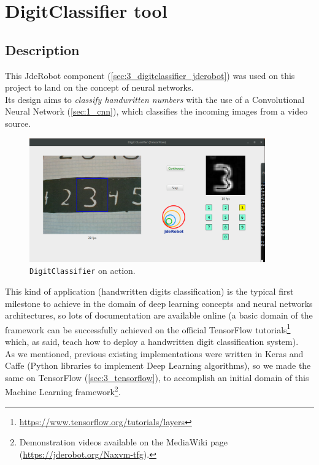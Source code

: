 \chapter{DigitClassifier tool}
	\label{chap:4_digitclassifier}
	\section{Description}
		This JdeRobot component (\autoref{sec:3_digitclassifier_jderobot}) was used on this project to land on the concept of neural networks.\\
	
		Its design aims to \textit{classify handwritten numbers} with the use of a Convolutional Neural Network (\autoref{sec:1_cnn}), which classifies the incoming images from a video source.\\
		
		\begin{figure}[h]
			\centering
			\includegraphics[width=4in]{images/digitclassifier}
			\caption{\texttt{DigitClassifier} on action.}
			\label{fig:4_digitclassifier}
		\end{figure}
		
		This kind of application (handwritten digits classification) is the typical first milestone to achieve in the domain of deep learning concepts and neural networks architectures, so lots of documentation are available online (a basic domain of the framework can be successfully achieved on the official TensorFlow tutorials\footnote{\url{https://www.tensorflow.org/tutorials/layers}} which, as said, teach how to deploy a handwritten digit classification system).\\


		As we mentioned, previous existing implementations were written in Keras \cite{dpascualhe} and Caffe \cite{noyaga} (Python libraries to implement Deep Learning algorithms), so we made the same on TensorFlow (\autoref{sec:3_tensorflow}), to accomplish an initial domain of this Machine Learning framework\footnote{Demonstration videos available on the MediaWiki page (\url{https://jderobot.org/Naxvm-tfg}).}.\\
		
